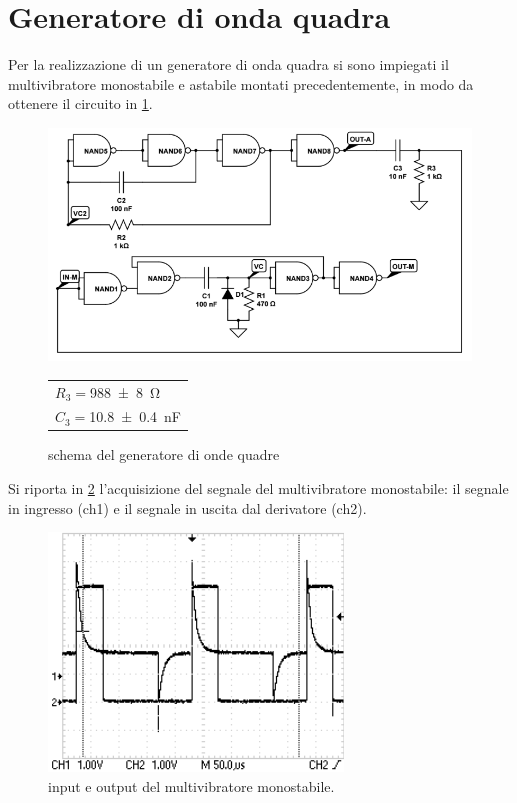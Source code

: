 
\section{Generatore di onda quadra}
	Per la realizzazione di un generatore di onda quadra si sono impiegati il multivibratore monostabile e astabile montati precedentemente, in modo da ottenere il circuito in \figurename{ \ref{f:qadra}}.
	
	\begin{figure}[H]
		\begin{minipage}{0.75\textwidth}
		\centering
		\includegraphics[scale=0.6]{../Figs-Tabs/qadra.png}
		\caption{schema del generatore di onde quadre}
		\label{f:qadra}
		\end{minipage}
		\begin{minipage}{0.14\textwidth}
			\begin{tabular}{l}
		$R_{3}=$\SI{988 \pm 8}{\ohm}\\
		$C_{3}=$\SI{10.8 \pm 0.4 }{\nano \farad}
			\end{tabular}
		\end{minipage}
	\end{figure}
	
	Si riporta in \figurename{ \ref{f:osci-qad}} l'acquisizione del segnale del multivibratore monostabile: il segnale in ingresso (ch1) e il segnale in uscita dal derivatore (ch2).
	
	\begin{figure}[H]
		\centering
		\includegraphics[scale=1.0]{../Figs-Tabs/deth_generator.png}
		\caption{input e output del multivibratore monostabile.}
		\label{f:osci-qad}
	\end{figure}
	
